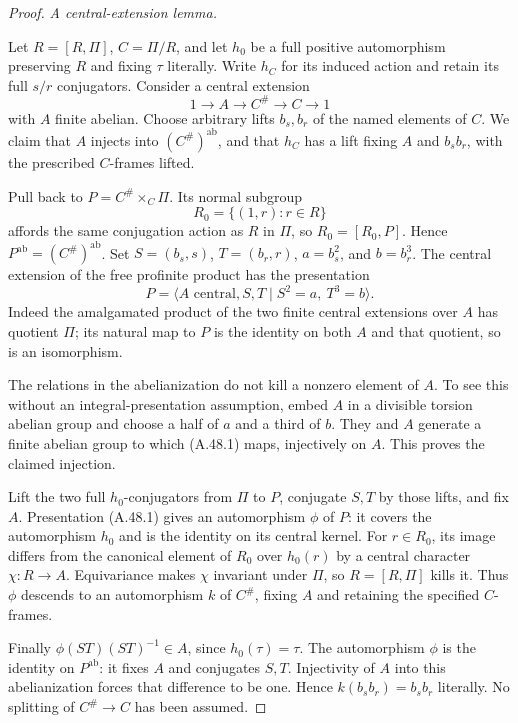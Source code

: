 \begin{proof}
\emph{A central-extension lemma.}\par
Let \(R=[R,\Pi]\), \(C=\Pi/R\), and let
\(h_0\) be a full positive automorphism
preserving \(R\) and fixing \(\tau\) literally.
Write \(h_C\) for its induced action and retain
its full \(s/r\) conjugators. Consider a central
extension
\[
                 1\longrightarrow A\longrightarrow
                 C^\#\longrightarrow C\longrightarrow1
\]
with \(A\) finite abelian. Choose arbitrary
lifts \(b_s,b_r\) of the named elements of
\(C\). We claim that \(A\) injects into
\((C^\#)^{\mathrm{ab}}\), and that \(h_C\)
has a lift fixing \(A\) and \(b_sb_r\), with
the prescribed \(C\)-frames lifted.

Pull back to \(P=C^\#\times_C\Pi\). Its
normal subgroup
\[
                  R_0=\{(1,r):r\in R\}
\]
affords the same conjugation action as \(R\)
in \(\Pi\), so \(R_0=[R_0,P]\). Hence
\(P^{\mathrm{ab}}=(C^\#)^{\mathrm{ab}}\).
Set \(S=(b_s,s)\), \(T=(b_r,r)\),
\(a=b_s^2\), and \(b=b_r^3\). The central
extension of the free profinite product has
the presentation
\[
 P=\langle A\text{ central},S,T\mid
                  S^2=a,\ T^3=b\rangle.
 \tag{A.48.1}
\]
Indeed the amalgamated product of the two finite
central extensions over \(A\) has quotient
\(\Pi\); its natural map to \(P\) is the
identity on both \(A\) and that quotient,
so is an isomorphism.

The relations in the abelianization do not
kill a nonzero element of \(A\). To see this
without an integral-presentation assumption,
embed \(A\) in a divisible torsion abelian
group and choose a half of \(a\) and a third
of \(b\). They and \(A\) generate a finite
abelian group to which (A.48.1) maps, injectively
on \(A\). This proves the claimed injection.

Lift the two full \(h_0\)-conjugators from
\(\Pi\) to \(P\), conjugate \(S,T\) by
those lifts, and fix \(A\). Presentation
(A.48.1) gives an automorphism \(\phi\) of
\(P\): it covers the automorphism \(h_0\)
and is the identity on its central kernel.
For \(r\in R_0\), its image differs from
the canonical element of \(R_0\) over
\(h_0(r)\) by a central character
\(\chi:R\to A\). Equivariance makes
\(\chi\) invariant under \(\Pi\), so
\(R=[R,\Pi]\) kills it. Thus \(\phi\)
descends to an automorphism \(k\) of
\(C^\#\), fixing \(A\) and retaining the
specified \(C\)-frames.

Finally \(\phi(ST)(ST)^{-1}\in A\), since
\(h_0(\tau)=\tau\). The automorphism \(\phi\)
is the identity on \(P^{\mathrm{ab}}\):
it fixes \(A\) and conjugates \(S,T\).
Injectivity of \(A\) into this abelianization
forces that difference to be one. Hence
\(k(b_sb_r)=b_sb_r\) literally. No splitting
of \(C^\#\to C\) has been assumed.


\end{proof}
